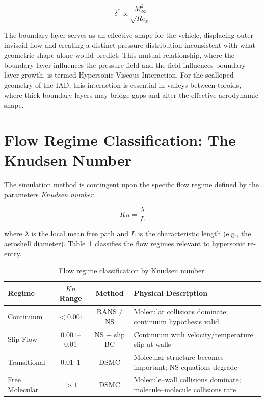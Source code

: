 \begin{equation}
    \delta^* \propto \frac{M_{\infty}^2}{\sqrt{Re_x}}
\end{equation}

The boundary layer serves as an effective shape for the vehicle, displacing outer inviscid flow and creating a distinct pressure distribution inconsistent with what geometric shape alone would predict. This mutual relationship, where the boundary layer influences the pressure field and the field influences boundary layer growth, is termed Hypersonic Viscous Interaction. For the scalloped geometry of the IAD, this interaction is essential in valleys between toroids, where thick boundary layers may bridge gaps and alter the effective aerodynamic shape.

\section{Flow Regime Classification: The Knudsen Number}

The simulation method is contingent upon the specific flow regime defined by the parameters \textit{Knudsen number}.

\begin{equation}
    Kn = \frac{\lambda}{L}
    \label{eq:knudsen_definition}
\end{equation}

\noindent where $\lambda$ is the local mean free path and $L$ is the characteristic length (e.g., the aeroshell diameter). Table~\ref{tab:knudsen_regimes} classifies the flow regimes relevant to hypersonic re-entry.

\begin{table}[H]
    \centering
    \caption{Flow regime classification by Knudsen number.}
    \label{tab:knudsen_regimes}
    \begin{tabular}{|l|c|c|p{4.5cm}|}
    \hline
    \textbf{Regime} & \textbf{$Kn$ Range} & \textbf{Method} & \textbf{Physical Description} \\ \hline
    Continuum & $< 0.001$ & RANS / NS & Molecular collisions dominate; continuum hypothesis valid \\ \hline
    Slip Flow & $0.001$--$0.01$ & NS + slip BC & Continuum with velocity/temperature slip at walls \\ \hline
    Transitional & $0.01$--$1$ & DSMC & Molecular structure becomes important; NS equations degrade \\ \hline
    Free Molecular & $> 1$ & DSMC & Molecule--wall collisions dominate; molecule--molecule collisions rare \\ \hline
    \end{tabular}
\end{table}

